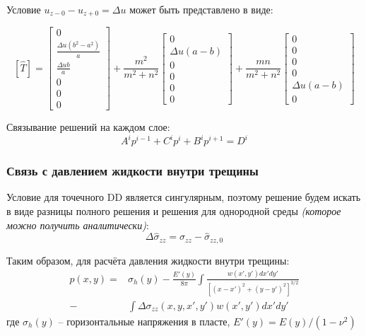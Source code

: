 \documentclass[10pt]{beamer}
\begin{document}
\begin{frame}
	\frametitle{}
	Условие $u_{z-0} - u_{z+0} = \Delta u$ может быть представлено в виде:

	\begin{equation}
		\label{eq:JumpCondition}
		\left[ \hat{T} \right] = 
		\left[ \begin{array}{c} 
			0 \\ \frac{\Delta u(b^2 - a^2)}{a} \\ \frac{\Delta ub}{a} \\ 0 \\ 0 \\ 0 
		\end{array} \right]
		+
		\frac{m^2}{m^2+n^2} \left[ \begin{array}{c} 
			0 \\ \Delta u(a-b) \\ 0 \\ 0 \\ 0 \\ 0 
		\end{array} \right]
		+
		\frac{mn}{m^2+n^2} \left[ \begin{array}{c} 
			0 \\ 0 \\ 0 \\ 0 \\ \Delta u(a-b) \\ 0 
		\end{array} \right]	
	\end{equation}

	Связывание решений на каждом слое:
	\begin{equation}
		A^i p^{i-1} + C^i p^i + B^i p^{i+1} = D^i
	\end{equation}
	
\end{frame}




\begin{frame}
\frametitle{Связь с давлением жидкости внутри трещины}
Условие для точечного DD является сингулярным, поэтому решение будем искать в виде 
разницы полного решения и решения для однородной среды \textit{(которое можно получить аналитически)}:
\begin{equation}
	\Delta \hat{\sigma}_{zz} = \hat{\sigma}_{zz} - \hat{\sigma}_{zz,0}
\end{equation}

Таким образом, для расчёта давления жидкости внутри трещины:
\begin{equation}
	\label{eq:fluidPressure}
	\begin{split}
	p(x,y) = & \sigma_h(y)-\frac{E'(y)}{8\pi}\int \frac{w(x',y')dx'dy'}{\left[(x-x')^2+(y-y')^2\right]^{3/2}} \\
	- & \int \Delta\sigma_{zz}(x,y,x',y')w(x',y')dx'dy'
	\end{split}
\end{equation}
где $\sigma_h(y)$ -- горизонтальные напряжения в пласте, $ E'(y) = E(y)/(1-\nu^2) $
\end{frame}
\end{document}
